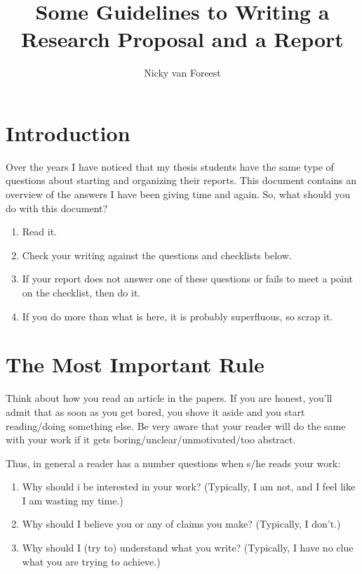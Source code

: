 \documentclass{article}
\title{Some Guidelines to Writing a Research Proposal and a Report}
\author{Nicky van Foreest}
\begin{document}
\maketitle

\section{Introduction}
\label{sec:introduction-1}

Over the years I have noticed that my thesis students have the same
type of questions about starting and organizing their reports. This
document contains an overview of the answers I have been giving time
and again. So, what should you do with this document? 
\begin{enumerate}
\item Read it.
\item Check your writing against the questions and checklists below.
\item If your report does not answer one of these questions or fails
  to meet a point on the checklist, then do it.
\item If you do more than what is here, it is probably superfluous, so
  scrap it.
\end{enumerate}

\section{The Most Important Rule}
\label{sec:most-important-rule}

Think about how you read an article in the papers. If you are honest,
you'll admit that as soon as you get bored, you shove it aside and you
start reading/doing something else. Be very aware that your reader
will do the same with your work if it gets
boring/unclear/unmotivated/too abstract.

Thus, in general a reader has a number questions when s/he reads your
work:
  \begin{enumerate}
  \item Why should i be interested in your work? (Typically, I am not,
    and I feel like I am wasting my time.) \label{item:1}
  \item Why should I believe you or any of claims you make? (Typically, I don't.) \label{item:2}
  \item Why should I (try to) understand what you write?  (Typically,
    I have no clue what you are trying to achieve.) \label{item:3}
  \end{enumerate}
\end{document}
